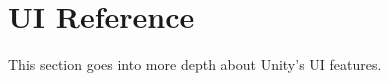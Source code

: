 \chapter{UI Reference}
\hypertarget{md__library_2_package_cache_2com_8unity_8ugui_0d1_80_80_2_documentation_0i_2_u_i_reference}{}\label{md__library_2_package_cache_2com_8unity_8ugui_0d1_80_80_2_documentation_0i_2_u_i_reference}
\label{md__library_2_package_cache_2com_8unity_8ugui_0d1_80_80_2_documentation_0i_2_u_i_reference_autotoc_md1502}%
%
 This section goes into more depth about Unity’s UI features. 